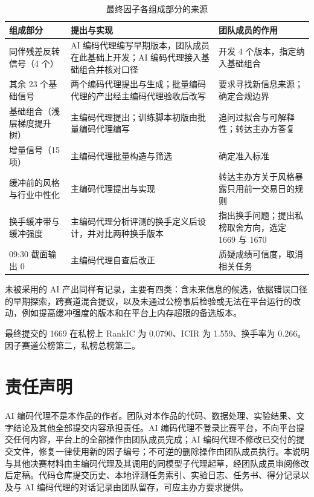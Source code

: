 \documentclass[UTF8,a4paper,zihao=-4,fontset=none]{ctexart}
\newcommand{\tablesetup}{\small\linespread{1.05}\selectfont\renewcommand{\arraystretch}{1.18}}
\begin{document}
\begin{table}[!htbp]
\caption{最终因子各组成部分的来源}
\centering
{\tablesetup
\begin{tabularx}{\textwidth}{@{}P{3.4cm}LL@{}}
\toprule
组成部分 & 提出与实现 & 团队成员的作用\\
\midrule
同伴残差反转信号（4 个） & AI 编码代理编写早期版本，团队成员在此基础上开发；AI 编码代理接入基础组合并核对口径 & 开发 4 个版本，指定纳入基础组合\\
其余 23 个基础信号 & 两个编码代理提出与生成；批量编码代理的产出经主编码代理验收后改写 & 要求寻找新信息来源；确定合规边界\\
基础组合（浅层梯度提升树） & 主编码代理提出；训练脚本初版由批量编码代理编写 & 追问过拟合与可解释性；转达主办方答复\\
增量信号（15 项） & 主编码代理批量构造与筛选 & 确定准入标准\\
缓冲前的风格与行业中性化 & 主编码代理提出与实现 & 转达主办方关于风格暴露只用前一交易日的规则\\
换手缓冲带与缓冲强度 & 主编码代理分析评测的换手定义后设计，并对比两种换手版本 & 指出换手问题；提出私榜取舍方向，选定 1669 与 1670\\
09:30 截面输出 0 & 主编码代理自查后改正 & 质疑成绩可信度，取消相关任务\\
\bottomrule
\end{tabularx}}
\end{table}

未被采用的 AI 产出同样有记录，主要有四类：含未来信息的候选，依据错误口径的早期探索，跨赛道混合提议，以及未通过公榜事后检验或无法在平台运行的改动，例如提高缓冲强度的版本和在平台上内存超限的备选版本。

最终提交的 1669 在私榜上 RankIC 为 0.0790、ICIR 为 1.559、换手率为 0.266。因子赛道公榜第二，私榜总榜第二。

\section{责任声明}

AI 编码代理不是本作品的作者。团队对本作品的代码、数据处理、实验结果、文字结论及其他全部提交内容承担责任。AI 编码代理不登录比赛平台，不向平台提交任何内容，平台上的全部操作由团队成员完成；AI 编码代理不修改已交付的提交文件，修复一律使用新的因子编号；不可逆的删除操作由团队成员执行。本说明与其他决赛材料由主编码代理及其调用的同模型子代理起草，经团队成员审阅修改后定稿。代码仓库提交历史、本地评测任务索引、实验日志、任务书、得分记录以及与 AI 编码代理的对话记录由团队留存，可应主办方要求提供。
\end{document}
